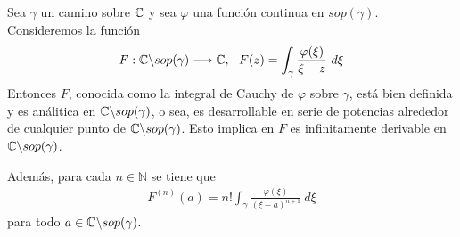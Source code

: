 \begin{teo}
    Sea $\gamma$ un camino sobre $\mathbb{C}$ y sea $\varphi$ una función continua en $sop(\gamma)$. Consideremos la función
    \begin{align*}
        F : \mathbb{C} \backslash sop(\gamma) \longrightarrow \mathbb{C}, \ \ F(z) = \int_{\gamma}{\frac{\varphi(\xi)}{\xi - z} \ d\xi}
    \end{align*}
    Entonces $F$, conocida como la integral de Cauchy de $\varphi$ sobre $\gamma$, está bien definida y es análitica en $\mathbb{C} \backslash sop(\gamma)$, o sea, es desarrollable en serie de potencias alrededor de cualquier punto de $\mathbb{C} \backslash sop(\gamma)$. Esto implica en $F$ es infinitamente derivable en $\mathbb{C} \backslash sop(\gamma)$.

    Además, para cada $n \in \mathbb{N}$ se tiene que
    \begin{align*}
        F^{(n)}(a) = n! \int_{\gamma}{\frac{\varphi(\xi)}{(\xi - a)^{n+1}} \ d\xi}
    \end{align*}
    para todo $a \in \mathbb{C} \backslash sop(\gamma)$.
\end{teo}

